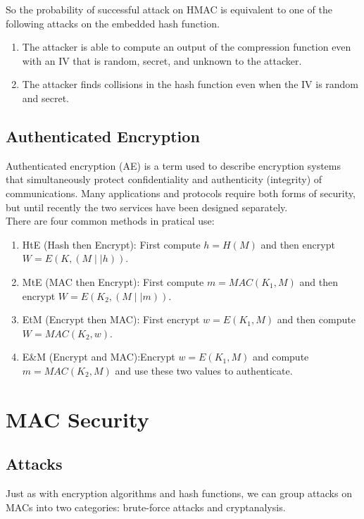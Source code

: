 \documentclass[12pt,a4paper,oneside]{report}
\begin{document}
So the probability of successful attack on HMAC is equivalent to one of the following attacks on the embedded hash function.
\begin{enumerate}[(1)]
    \item The attacker is able to compute an output of the compression function even
with an IV that is random, secret, and unknown to the attacker.
    \item The attacker finds collisions in the hash function even when the IV is random
and secret.
\end{enumerate}

\section{Authenticated Encryption}
Authenticated encryption (AE) is a term used to describe encryption systems that simultaneously protect confidentiality and authenticity (integrity) of communications. Many applications and protocols require both forms of security, but until recently the two services have been designed separately.\\


There are four common methods in pratical use:
\begin{enumerate}[(1)]
    \item HtE (Hash then Encrypt): First compute $h=H(M)$ and then encrypt $W=E(K,(M\mid\mid h))$.
    \item MtE (MAC then Encrypt): First compute $m=MAC(K_1,M)$ and then encrypt $W=E(K_2,(M\mid\mid m))$.
    \item EtM (Encrypt then MAC): First encrypt $w=E(K_1,M)$ and then compute $W=MAC(K_2,w)$.
    \item E\&M (Encrypt and MAC):Encrypt $w=E(K_1,M)$ and compute $m=MAC(K_2,M)$ and use these two values to authenticate.
\end{enumerate}










\chapter{  MAC Security}
\section{Attacks}
Just as with encryption algorithms and hash functions, we can group attacks on
MACs into two categories: brute-force attacks and cryptanalysis.\\
\end{document}
